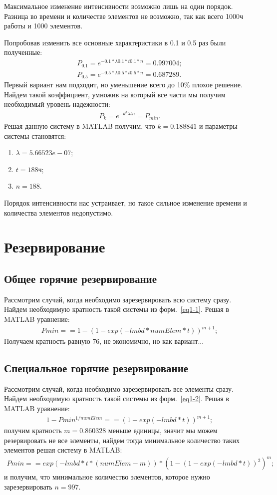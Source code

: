 	Максимальное изменение интенсивности возможно лишь на один порядок. Разница во времени и количестве элементов не возможно, так как всего 1000ч работы и 1000 элементов.

	Попробовав изменить все основные характеристики в 0.1 и 0.5 раз были полученные:
	\begin{gather*}
		P_{0.1} = e^{-0.1*\lambda 0.1*t 0.1*n} = 0.997004;\\
		P_{0.5} = e^{-0.5*\lambda 0.5*t 0.5*n} = 0.687289.
	\end{gather*}
	Первый вариант нам подходит, но уменьшение всего до 10\% плохое решение. Найдем такой коэффициент, умножив на который все части мы получим необходимый уровень надежности:
	\begin{gather*}
		P_{k} = e^{-k^{3}\lambda t n} = P_{min}.
	\end{gather*}
	Решая данную систему в MATLAB получим, что $k = 0.188841$ и параметры системы становятся:
	\begin{enumerate}
		\item $\lambda = 5.66523e-07$;
		\item $t = 188$ч;
		\item $n = 188$.
	\end{enumerate}
	Порядок интенсивности нас устраивает, но такое сильное изменение времени и количества элементов недопустимо.
\section{Резервирование}
\subsection{Общее горячие резервирование}
	Рассмотрим случай, когда необходимо зарезервировать всю систему сразу. Найдем необходимую кратность такой системы из форм.~\ref{eq1-1}. Решая в MATLAB уравнение:
	\begin{gather*}
		Pmin == 1 - (1 - exp(-lmbd*numElem*t))^{m+1};
	\end{gather*}
	Получаем кратность равную $76$, не экономично, но как вариант...
\subsection{Специальное горячие резервирование}
	Рассмотрим случай, когда необходимо зарезервировать все элементы сразу. Найдем необходимую кратность такой системы из форм.~\ref{eq1-2}. Решая в MATLAB уравнение:
	\begin{gather*}
		1 - Pmin^{1/numElem} ==  (1 - exp(-lmbd*t))^{m+1};
	\end{gather*}
	получим кратность $m = 0.860328$ меньше единицы, значит мы можем резервировать не все элементы, найдем тогда минимальное количество таких элементов решая систему в MATLAB:
	\begin{gather*}
		Pmin == exp(-lmbd*t*(numElem - m))*(1 - (1 - exp(-lmbd*t))^{2})^{m};
	\end{gather*}
	и получим, что минимальное количество элементов, которое нужно зарезервировать $n = 997$.

